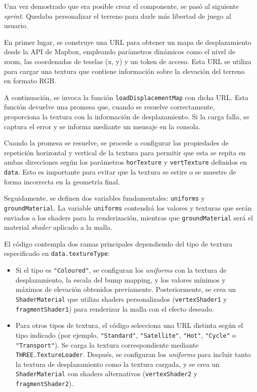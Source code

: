 \documentclass[a4paper, 12pt]{book}
\begin{document}
Una vez demostrado que era posible crear el componente, se pasó al siguiente \textit{sprint}. Quedaba personalizar el terreno para darle más libertad de juego al usuario.

En primer lugar, se construye una URL para obtener un mapa de desplazamiento desde la API de Mapbox, empleando parámetros dinámicos como el nivel de zoom, las coordenadas de teselas (x, y) y un token de acceso. Esta URL se utiliza para cargar una textura que contiene información sobre la elevación del terreno en formato RGB.

A continuación, se invoca la función \texttt{loadDisplacementMap} con dicha URL. Esta función devuelve una promesa que, cuando se resuelve correctamente, proporciona la textura con la información de desplazamiento. Si la carga falla, se captura el error y se informa mediante un mensaje en la consola.

Cuando la promesa se resuelve, se procede a configurar las propiedades de repetición horizontal y vertical de la textura para permitir que esta se repita en ambas direcciones según los parámetros \texttt{horTexture} y \texttt{vertTexture} definidos en \texttt{data}. Esto es importante para evitar que la textura se estire o se muestre de forma incorrecta en la geometría final.

Seguidamente, se definen dos variables fundamentales: \texttt{uniforms} y \texttt{groundMaterial}. La variable \texttt{uniforms} contendrá los valores y texturas que serán enviados a los shaders para la renderización, mientras que \texttt{groundMaterial} será el material \textit{shader} aplicado a la malla.

El código contempla dos ramas principales dependiendo del tipo de textura especificado en \texttt{data.textureType}:

\begin{itemize}
  \item Si el tipo es \texttt{"Coloured"}, se configuran los \textit{uniforms} con la textura de desplazamiento, la escala del bump mapping, y los valores mínimos y máximos de elevación obtenidos previamente. Posteriormente, se crea un \texttt{ShaderMaterial} que utiliza shaders personalizados (\texttt{vertexShader1} y \texttt{fragmentShader1}) para renderizar la malla con el efecto deseado.
  
  \item Para otros tipos de textura, el código selecciona una URL distinta según el tipo indicado (por ejemplo, \texttt{"Standard"}, \texttt{"Satellite"}, \texttt{"Hot"}, \texttt{"Cycle"} o \texttt{"Transport"}). Se carga la textura correspondiente mediante \texttt{THREE.TextureLoader}. Después, se configuran los \textit{uniforms} para incluir tanto la textura de desplazamiento como la textura cargada, y se crea un \texttt{ShaderMaterial} con shaders alternativos (\texttt{vertexShader2} y \texttt{fragmentShader2}).
\end{itemize}
\end{document}
